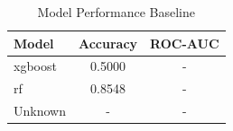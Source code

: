 \begin{table}[htbp]
\centering
\caption{Model Performance Baseline}
\label{tab:model_performance}
\begin{tabular}{lcc}
\toprule
Model & Accuracy & ROC-AUC \\
\midrule
xgboost & 0.5000 & - \\
rf & 0.8548 & - \\
Unknown & - & - \\
\bottomrule
\end{tabular}
\end{table}
